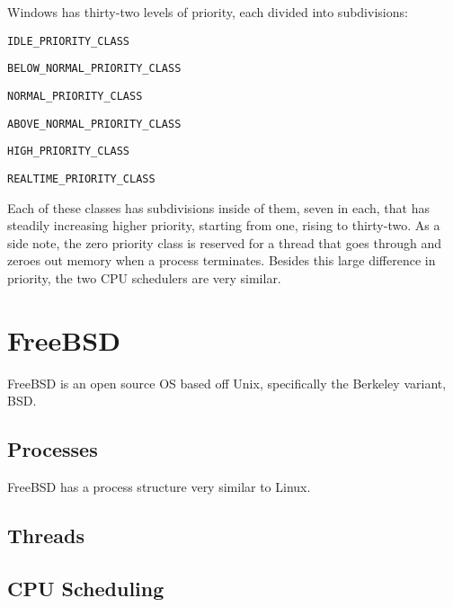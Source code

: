 \documentclass[10pt,letterpaper,onecolumn,draftclsnofoot]{IEEEtran}
\begin{document}
  Windows has thirty-two levels of priority, each divided into subdivisions:
  \begin{description}
    \item \texttt{IDLE\_PRIORITY\_CLASS}
    \item \texttt{BELOW\_NORMAL\_PRIORITY\_CLASS}
    \item \texttt{NORMAL\_PRIORITY\_CLASS}
    \item \texttt{ABOVE\_NORMAL\_PRIORITY\_CLASS}
    \item \texttt{HIGH\_PRIORITY\_CLASS}
    \item \texttt{REALTIME\_PRIORITY\_CLASS}
  \end{description}

  Each of these classes has subdivisions inside of them, seven in each, that
  has steadily increasing higher priority, starting from one, rising to thirty-two.
  As a side note, the zero priority class is reserved for a thread that goes through
  and zeroes out memory when a process terminates.\cite{msschedule2016} Besides
  this large difference in priority, the two CPU schedulers are very similar.

\section{FreeBSD}
FreeBSD is an open source OS based off Unix, specifically the Berkeley variant,
BSD.
  \subsection{Processes}
FreeBSD has a process structure very similar to Linux.
  \subsection{Threads}
  \subsection{CPU Scheduling}
\clearpage
\end{document}
